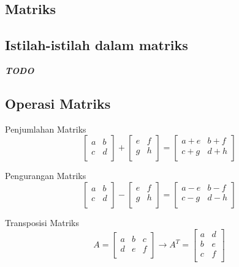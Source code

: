 \documentclass{report}
\begin{document}
\begin{enumerate}
\chapter{Matriks}

\section{Istilah-istilah dalam matriks}
\textit{\textbf{TODO}}
\section{Operasi Matriks}

Penjumlahan Matriks
\begin{equation}
\label{max_add}
	\begin{bmatrix}
		a & b \\
		c & d \\
	\end{bmatrix}
	+
	\begin{bmatrix}
		e & f \\
		g & h \\
	\end{bmatrix}
	= 
	\begin{bmatrix}
		a + e & b + f \\
		c + g & d + h \\
	\end{bmatrix}
\end{equation}

Pengurangan Matriks
\begin{equation}
\label{max_sub}
	\begin{bmatrix}
		a & b \\
		c & d \\
	\end{bmatrix}
	-
	\begin{bmatrix}
		e & f \\
		g & h \\
	\end{bmatrix}
	= 
	\begin{bmatrix}
		a - e & b - f \\
		c - g & d - h \\
	\end{bmatrix}
\end{equation}


Transposisi Matriks
\begin{equation}
\label{max_transp}
    A = \begin{bmatrix}
		a & b & c\\
		d & e & f\\
	\end{bmatrix}
	\to
	A^{T} = \begin{bmatrix}
		a & d \\
		b & e \\
		c & f \\
	\end{bmatrix}
\end{equation}


\end{enumerate}
\end{document}
